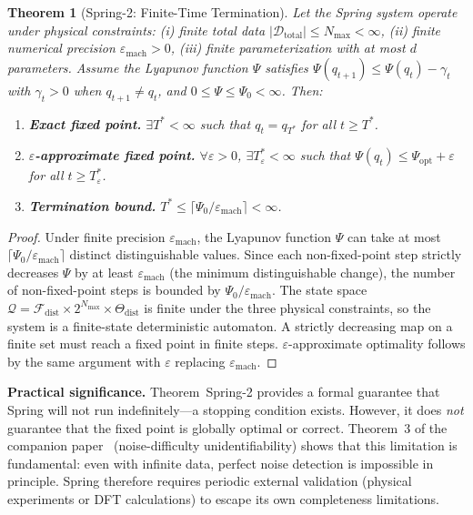 \documentclass[11pt,a4paper]{article}
\theoremstyle{plain}
\newtheorem{theorem}{Theorem}[section]
\theoremstyle{definition}
\theoremstyle{remark}
\newcommand{\F}{\mathcal{F}}
\newcommand{\D}{\mathcal{D}}
\begin{document}
\begin{theorem}[Spring-2: Finite-Time Termination]\label{thm:spring2}
    Let the Spring system operate under physical constraints: (i) finite total data $|\D_{\text{total}}| \leq N_{\max} < \infty$, (ii) finite numerical precision $\varepsilon_{\text{mach}} > 0$, (iii) finite parameterization with at most $d$ parameters. Assume the Lyapunov function $\Psi$ satisfies $\Psi(q_{t+1}) \leq \Psi(q_t) - \gamma_t$ with $\gamma_t > 0$ when $q_{t+1} \neq q_t$, and $0 \leq \Psi \leq \Psi_0 < \infty$. Then:
    \begin{enumerate}[label=(\alph*), nosep]
        \item \textbf{Exact fixed point.} $\exists T^* < \infty$ such that $q_t = q_{T^*}$ for all $t \geq T^*$.
        \item \textbf{$\varepsilon$-approximate fixed point.} $\forall \varepsilon > 0$, $\exists T_\varepsilon^* < \infty$ such that $\Psi(q_t) \leq \Psi_{\text{opt}} + \varepsilon$ for all $t \geq T_\varepsilon^*$.
        \item \textbf{Termination bound.} $T^* \leq \lceil \Psi_0 / \varepsilon_{\text{mach}} \rceil < \infty$.
    \end{enumerate}
\end{theorem}

\begin{proof}
    Under finite precision $\varepsilon_{\text{mach}}$, the Lyapunov function $\Psi$ can take at most $\lceil \Psi_0 / \varepsilon_{\text{mach}} \rceil$ distinct distinguishable values. Since each non-fixed-point step strictly decreases $\Psi$ by at least $\varepsilon_{\text{mach}}$ (the minimum distinguishable change), the number of non-fixed-point steps is bounded by $\Psi_0 / \varepsilon_{\text{mach}}$. The state space $\mathcal{Q} = \F_{\text{dist}} \times 2^{N_{\max}} \times \Theta_{\text{dist}}$ is finite under the three physical constraints, so the system is a finite-state deterministic automaton. A strictly decreasing map on a finite set must reach a fixed point in finite steps. $\varepsilon$-approximate optimality follows by the same argument with $\varepsilon$ replacing $\varepsilon_{\text{mach}}$.
\end{proof}

\textbf{Practical significance.} Theorem~Spring-2 provides a formal guarantee that Spring will not run indefinitely---a stopping condition exists. However, it does \emph{not} guarantee that the fixed point is globally optimal or correct. Theorem~3 of the companion paper~\citep{scx2026} (noise-difficulty unidentifiability) shows that this limitation is fundamental: even with infinite data, perfect noise detection is impossible in principle. Spring therefore requires periodic external validation (physical experiments or DFT calculations) to escape its own completeness limitations.
\end{document}
